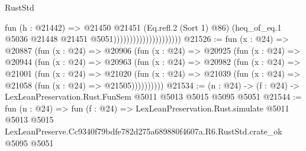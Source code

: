 \begin{lexlean}{RustStd}
\begin{coremodule}
                                          fun (h : @21442) =>
                                          @21450
                                            @21451
                                            (Eq.refl.{2} (Sort 1) @86)
                                            (heq_of_eq.{1}
                                              @5036
                                              @21448
                                              @21451
                                              @5051)))))))))))))))))))))
@21526 := fun (x : @24) =>
  @20887
    (fun (x : @24) =>
    @20906
      (fun (x : @24) =>
      @20925
        (fun (x : @24) =>
        @20944
          (fun (x : @24) =>
          @20963
            (fun (x : @24) =>
            @20982
              (fun (x : @24) =>
              @21001
                (fun (x : @24) =>
                @21020
                  (fun (x : @24) =>
                  @21039 (fun (x : @24) => @21058 (fun (x : @24) => @21505))))))))))
@21534 := (n : @24) -> (f : @24) -> LexLeanPreservation.Rust.FunSem @5011 @5013 @5015 @5095 @5051
@21544 := fun (n : @24) =>
  fun (f : @24) =>
  LexLeanPreservation.Rust.simulate
    @5011
    @5013
    @5015
    LexLeanPreserve.Cc9340f79bdfe782d275a689880f4607a.R6.RustStd.crate_ok
    @5095
    @5051
\end{coremodule}
\end{lexlean}

